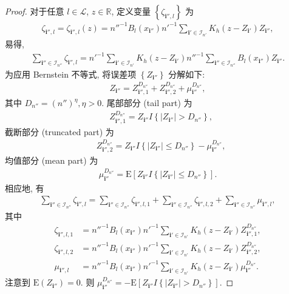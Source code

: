 \documentclass[a4paper,openay,14pt]{ctexbook}
\numberwithin{equation}{section}
\numberwithin{lem}{section}
\begin{document}
\begin{proof}
    对于任意 $l\in\mathcal{L}$, $z\in\mathbb{R}$, 定义变量 $\left\{ \zeta_{\mathbf{i}'',l}\right\}$ 为
    \begin{align*}
        \zeta_{\mathbf{i}'',l} = \zeta_{\mathbf{i}'',l}(z) = n''^{-1}B_{l}\left(x_{\mathbf{i}''}\right)n'^{-1}\sum_{\mathbf{i}'\in\mathcal{I}_{n'}}K_h(z-Z_{\mathbf{i}'})Z_{\mathbf{i}''},
    \end{align*}
   易得,
    \begin{align*}
        \sum_{\mathbf{i}''\in\mathcal{I}_{n''}}\zeta_{\mathbf{i}'',l}=n'^{-1}\sum_{\mathbf{i}'\in\mathcal{I}_{n'}}K_{h}\left(z-Z_{\mathbf{i}'}\right)n''^{-1}\sum_{\mathbf{i}''\in\mathcal{I}_{n''}}B_{l}\left(x_{\mathbf{i}''}\right)Z_{\mathbf{i}''}.
    \end{align*}
    为应用 Bernstein 不等式, 将误差项 $\left\{ Z_{\mathbf{i}''}\right\}$ 分解如下:
    \begin{align*}
        Z_{\mathbf{i}''} = Z_{\mathbf{i}'',1}^{D_{n''}} + Z_{\mathbf{i}'',2}^{D_{n''}} + \mu_{\mathbf{i}''}^{D_{n''}}, 
    \end{align*}
    其中 $D_{n''} = \left(n''\right)^{\eta},\eta>0$. 尾部部分 (tail part) 为
    \begin{align*}
        &Z_{\mathbf{i}'',1}^{D_{n''}} = Z_{\mathbf{i}''}I\left\{\vert Z_{\mathbf{i}''}\vert>D_{n''}\right\},
    \end{align*}
    截断部分 (truncated part) 为
    \begin{align*}
        &Z_{\mathbf{i}'',2}^{D_{n''}} = Z_{\mathbf{i}''}I\left\{\vert Z_{\mathbf{i}''}\vert\leq D_{n''}\right\} - \mu_{\mathbf{i}''}^{D_{n''}},        
    \end{align*}
    均值部分 (mean part) 为
    \begin{align*}
        \mu_{\mathbf{i}''}^{D_{n''}} = \mathrm{E}\left[Z_{\mathbf{i}''}I\left\{\vert Z_{\mathbf{i}''}\vert\leq D_{n''}\right\}\right].
    \end{align*}
    相应地, 有
    \begin{align*} 
        \sum_{\mathbf{i}''\in\mathcal{I}_{n''}}\zeta_{\mathbf{i}'',l} =  \sum_{\mathbf{i}''\in\mathcal{I}_{n''}}\zeta_{\mathbf{i}'',l,1}+\sum_{\mathbf{i}''\in\mathcal{I}_{n''}}\zeta_{\mathbf{i}'',l,2}+\sum_{\mathbf{i}''\in\mathcal{I}_{n''}}\mu_{\mathbf{i}'',l},
    \end{align*}
    其中
    \begin{align*}
        \zeta_{\mathbf{i}'',l,1} &= n''^{-1}B_{l}\left(x_{\mathbf{i}''}\right)n'^{-1}\sum_{\mathbf{i}'\in\mathcal{I}_{n'}}K_h(z-Z_{\mathbf{i}'})Z_{\mathbf{i}'',1}^{D_{n''}},\\
        \zeta_{\mathbf{i}'',l,2}& = n''^{-1}B_{l}\left(x_{\mathbf{i}''}\right)n'^{-1}\sum_{\mathbf{i}'\in\mathcal{I}_{n'}}K_h(z-Z_{\mathbf{i}'})Z_{\mathbf{i}'',2}^{D_{n''}},\\
        \mu_{\mathbf{i}'',l}& = n''^{-1}B_{l}\left(x_{\mathbf{i}''}\right)n'^{-1}\sum_{\mathbf{i}'\in\mathcal{I}_{n'}}K_h(z-Z_{\mathbf{i}'})\mu_{\mathbf{i}''}^{D_{n''}}.
    \end{align*}
    注意到 $\mathrm{E}(Z_{\mathbf{i}''}) = 0$. 则 $\mu_{\mathbf{i}''}^{D_{n''}} = -\mathrm{E}\left[Z_{\mathbf{i}''}I \left\{\vert Z_{\mathbf{i}''}\vert>D_{n''}\right\}\right]$. 
    

\end{proof}
\end{document}
